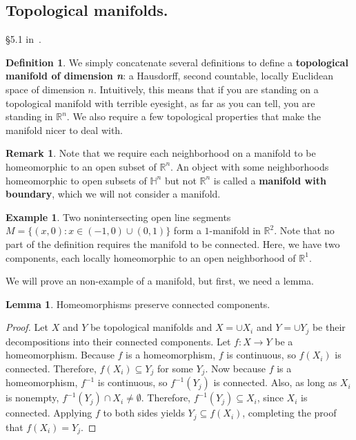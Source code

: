 \documentclass[12pt]{article}
\newcommand{\R}{\mathbb{R}}
\theoremstyle{definition}
\theoremstyle{definition}
\theoremstyle{definition}
\newtheorem{lem}[them]{Lemma}
\theoremstyle{definition}
\newtheorem{rmk}[them]{Remark}
\theoremstyle{definition}
\newtheorem{defn}[them]{Definition}
\theoremstyle{definition}
\newtheorem{ex}[them]{Example}
\theoremstyle{definition}
\theoremstyle{definition}
\begin{document}
\subsection{Topological manifolds.}
\par{§5.1 in~\cite{Tu}.}
\begin{defn}
    We simply concatenate several definitions to
    define a \textbf{topological manifold of
    dimension \textit{n}}: a Hausdorff, second
    countable, locally Euclidean space of
    dimension $n$. Intuitively, this means that if
    you are standing on a topological manifold
    with terrible eyesight, as far as you can
    tell, you are standing in $\R^n$. We also
    require a few topological properties that make
    the manifold nicer to deal with.
\end{defn}

\begin{rmk}
    Note that we require each neighborhood on a
    manifold to be homeomorphic to an open subset
    of $\R^n$. An object with some neighborhoods
    homeomorphic to open subsets of $\mathbb{H}^n$
    but not $\R^n$ is called a \textbf{manifold
    with boundary}, which we will not consider a
    manifold.
\end{rmk}

    
\begin{ex}
    Two nonintersecting open line segments $M =
    \{(x,0): x \in (-1,0) \cup (0,1)\}$ form a
    $1$-manifold in $\R^2$. Note that no part of
    the definition requires the manifold to be
    connected. Here, we have two components, each
    locally homeomorphic to an open neighborhood
    of $\R^1$.
\end{ex}

\par{We will prove an non-example of a manifold, but first, we need a lemma.}

\begin{lem} Homeomorphisms preserve connected
components.\end{lem}

\begin{proof}
    \par{Let $X$ and $Y$ be topological manifolds
    and $X = \cup X_i$ and $Y = \cup Y_j$ be their
    decompositions into their connected
    components. Let $f: X \to Y$ be a
    homeomorphism. Because $f$ is a homeomorphism,
    $f$ is continuous, so $f(X_i)$ is connected.
    Therefore, $f(X_i) \subseteq Y_j$ for some
    $Y_j$. Now because $f$ is a homeomorphism,
    $f^{-1}$ is continuous, so $f^{-1}(Y_j)$ is
    connected. Also, as long as $X_i$ is nonempty,
    $f^{-1}(Y_j) \cap X_i \neq \emptyset$.
    Therefore, $f^{-1}(Y_j) \subseteq X_i$}, since
    $X_i$ is connected. Applying $f$ to both sides
    yields $Y_j \subseteq f(X_i)$, completing the
    proof that $f(X_i) = Y_j$.
\end{proof}
\end{document}

